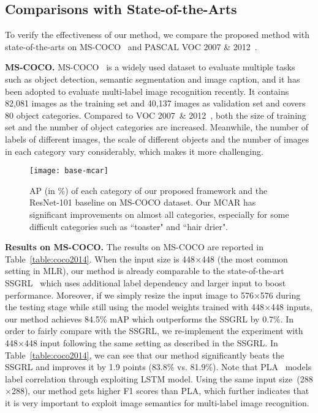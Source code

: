 \documentclass[journal]{IEEEtran}
\begin{document}
\subsection{Comparisons with State-of-the-Arts}\label{cstoa}
To verify the effectiveness of our method, we compare the proposed method with state-of-the-arts on MS-COCO~\cite{lin2014microsoft}  and PASCAL VOC 2007 \& 2012~\cite{everingham2010pascal}.

\noindent \textbf{MS-COCO.}
MS-COCO~\cite{lin2014microsoft} is a widely used dataset to evaluate multiple tasks such as object detection, semantic segmentation and image caption, and it has been adopted to evaluate multi-label image recognition recently. 
It contains 82,081 images as the training set and 40,137 images as validation set and covers 80 object categories.
Compared to VOC 2007~\& 2012~\cite{everingham2010pascal}, both the size of training set and the number of object categories are increased. Meanwhile, the number of labels of different images, the scale of different objects and the number of images in each category vary considerably, which makes it more challenging.

 \begin{figure*}[t]
 \centering
   \vspace{0pt}
 {\texttt{[image: base-mcar]}}
  \vspace{0pt}
\caption{AP (in $\%$) of each category of our proposed framework and the ResNet-101 baseline on MS-COCO dataset. Our MCAR has significant improvements on almost all categories, especially for some difficult categories such as ``toaster" and ``hair drier". } \label{fig:cocap}
\end{figure*}

\noindent \textbf{Results on MS-COCO.}
The results on MS-COCO are reported in Table~\ref{table:coco2014}. When the input size is 448$\times$448 (the most common setting in MLR), our method is already comparable to the state-of-the-art SSGRL~\cite{chenlearning} which uses additional label dependency and larger input to boost performance. Moreover, if we simply resize the input image to 576$\times$576 during the testing stage while still using the model weights trained with 448$\times$448 inputs, our method achieves 84.5\% mAP which outperforms the SSGRL by 0.7\%.
In order to fairly compare with the SSGRL, we re-implement the experiment with 448$\times$448 input following the same setting as described in the SSGRL. In Table~\ref{table:coco2014}, we can see that our method significantly beats the SSGRL and improves it by 1.9 points (83.8\% vs. 81.9\%). Note that PLA~\cite{yazici2020orderless} models label correlation through exploiting LSTM model. Using the same input size~(288$\times$288), our method gets higher F1 scores than PLA, which further indicates that it is very important to exploit image semantics for multi-label image recognition.
\end{document}

